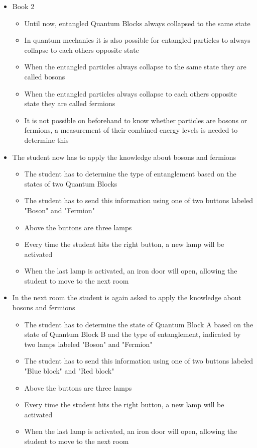 \documentclass[11pt,twoside]{report} %
\begin{document}
\begin{itemize}
	\item Book 2
	\begin{itemize}
		\item Until now, entangled Quantum Blocks always collapsed to the same state
		\item In quantum mechanics it is also possible for entangled particles to always collapse to each others opposite state
		\item When the entangled particles always collapse to the same state they are called bosons
		\item When the entangled particles always collapse to each others opposite state they are called fermions
		\item It is not possible on beforehand to know whether particles are bosons or fermions, a measurement of their combined energy levels is needed to determine this
	\end{itemize}
	\item The student now has to apply the knowledge about bosons and fermions
	\begin{itemize}
		\item The student has to determine the type of entanglement based on the states of two Quantum Blocks
		\item The student has to send this information using one of two buttons labeled "Boson" and "Fermion"
		\item Above the buttons are three lamps
		\item Every time the student hits the right button, a new lamp will be activated
		\item When the last lamp is activated, an iron door will open, allowing the student to move to the next room
	\end{itemize}
	\item In the next room the student is again asked to apply the knowledge about bosons and fermions
	\begin{itemize}
		\item The student has to determine the state of Quantum Block A based on the state of Quantum Block B and the type of entanglement, indicated by two lamps labeled "Boson" and "Fermion"
		\item The student has to send this information using one of two buttons labeled "Blue block" and "Red block"
		\item Above the buttons are three lamps
		\item Every time the student hits the right button, a new lamp will be activated
		\item When the last lamp is activated, an iron door will open, allowing the student to move to the next room

\end{itemize}
\end{itemize}
\end{document}
